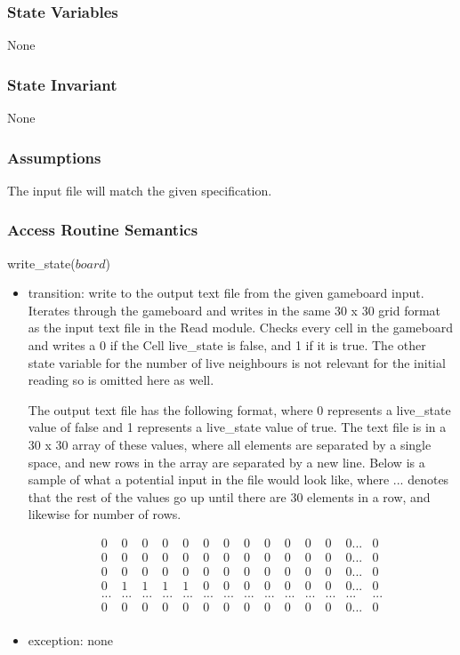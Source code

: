 \documentclass[12pt]{article}
\begin{document}
\subsubsection* {State Variables}

None

\subsubsection* {State Invariant}

None

\subsubsection* {Assumptions}

The input file will match the given specification.

\subsubsection* {Access Routine Semantics}

\noindent write\_state($board$)
\begin{itemize}
\item transition: write to the output text file from the given gameboard input.
  Iterates through the gameboard and writes in the same 30 x 30 grid format as the input text file in the Read module. Checks every cell in the gameboard and writes a 0 if the Cell live\_state is false, and 1 if it is true. The other state variable for the number of live neighbours is not relevant for the initial reading so is omitted here as well.

  The output text file has the following format, where 0 represents a live\_state value of false and 1 represents a live\_state value of true. The text file is in a 30 x 30 array of these values, where all elements are separated by a single space, and new rows in the array are separated by a new line. Below is a sample of what a potential input in the file would look like, where ... denotes that the rest of the values go up until there are 30 elements in a row, and likewise for number of rows.

  \begin{equation}
    \begin{array}{cccccccccccccc}
      0 & 0 & 0 & 0 & 0 & 0 & 0 & 0 & 0 & 0 & 0 & 0 & 0 ... & 0 \\ 
      0 & 0 & 0 & 0 & 0 & 0 & 0 & 0 & 0 & 0 & 0 & 0 & 0 ... & 0 \\
      0 & 0 & 0 & 0 & 0 & 0 & 0 & 0 & 0 & 0 & 0 & 0 & 0 ... & 0 \\
      0 & 1 & 1 & 1 & 1 & 0 & 0 & 0 & 0 & 0 & 0 & 0 & 0 ... & 0 \\
      ... & ... & ... & ... & ... & ... & ... & ... & ... & ... & ... & ... & ... & ... \\
      0 & 0 & 0 & 0 & 0 & 0 & 0 & 0 & 0 & 0 & 0 & 0 & 0 ... & 0 \\
    \end{array}
  \end{equation}

\item exception: none
\end{itemize}
\end{document}
